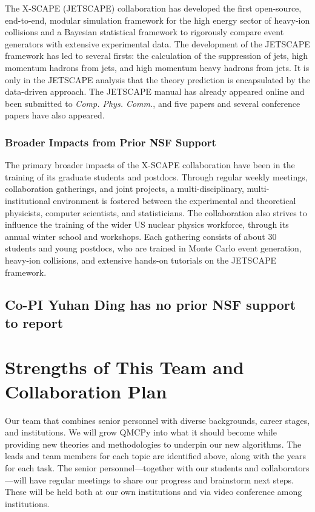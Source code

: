 \documentclass[11pt]{NSFamsart}
\newcommand{\cmtS}[1]{{\color{blue}{(Simon: #1)}}}
\begin{document}
The X-SCAPE (JETSCAPE) collaboration has developed the first open-source, end-to-end, modular simulation framework for the high energy sector of heavy-ion collisions and a Bayesian statistical framework to rigorously compare event generators with extensive experimental data. The development of the JETSCAPE framework has led to several firsts: the calculation of the suppression of jets, high momentum hadrons from jets, and high momentum heavy hadrons from jets. It is only in the JETSCAPE analysis that the theory prediction is encapsulated by the data-driven approach. The JETSCAPE manual has already appeared online and been submitted to \textit{Comp. Phys. Comm.}, and five papers \cite{cao2017multistage,kumar2019jetscape,everett2021multisystem,everett2021phenomenological,cao2021determining} and several conference papers \cite{soltz2018bayesian,tachibana2018jet,kauder2019jetscape,park2019multi} have also appeared.

\subsubsection{Broader Impacts from Prior NSF Support}
The primary broader impacts of the X-SCAPE collaboration have been in the training of its graduate students and postdocs. Through regular weekly meetings, collaboration gatherings, and joint projects, a multi-disciplinary, multi-institutional environment is fostered between the experimental and theoretical physicists, computer scientists, and statisticians. The collaboration also strives to influence the training of the wider US nuclear physics workforce, through its annual winter school and workshops. Each gathering consists of about 30 students and young postdocs, who are trained in Monte Carlo event generation, heavy-ion collisions, and extensive hands-on tutorials on the JETSCAPE framework.

\subsection{Co-PI Yuhan Ding has no prior NSF support to report}

\section{Strengths of This Team and Collaboration Plan}
\cmtS{May need further thought on DEI, seems to be increasingly important for grants nowadays.} Our team that combines senior personnel with diverse backgrounds, career stages, and institutions.  We will grow QMCPy into what it should become while providing new theories and methodologies to underpin our new algorithms. The leads and team members for each topic are identified above, along with the years for each task.  The senior personnel---together with our students and collaborators---will have regular meetings to share our progress and brainstorm next steps. These will be held both at our own institutions and via video conference among institutions.
\end{document}
